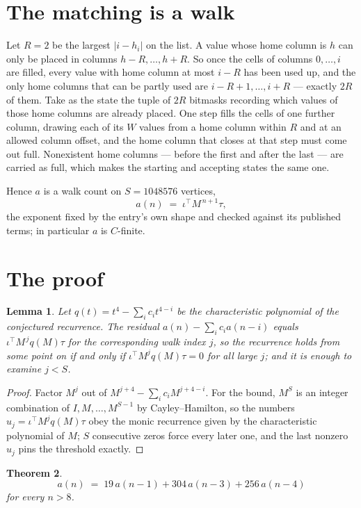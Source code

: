 \documentclass[11pt,a4paper]{article}
\theoremstyle{plain}
\newtheorem{theorem}{Theorem}
\newtheorem{lemma}[theorem]{Lemma}
\theoremstyle{definition}
\begin{document}
\section{The matching is a walk}

Let $R=2$ be the largest $|i-h_i|$ on the list. A value whose home column is $h$ can only be
placed in columns $h-R,\dots,h+R$. So once the cells of columns $0,\dots,i$ are filled, every
value with home column at most $i-R$ has been used up, and the only home columns that can be
partly used are $i-R+1,\dots,i+R$ --- exactly $2R$ of them. Take as the state the tuple of
$2R$ bitmasks recording which values of those home columns are already placed. One step fills
the cells of one further column, drawing each of its $W$ values from a home column within $R$
and at an allowed column offset, and the home column that closes at that step must come out
full. Nonexistent home columns --- before the first and after the last --- are carried as
full, which makes the starting and accepting states the same one.

Hence $a$ is a walk count on $S=1048576$ vertices,
\[
a(n)\;=\;\iota^{\!\top}M^{\,n+1}\tau ,
\]
the exponent fixed by the entry's own shape and checked against its published terms; in
particular $a$ is $C$-finite.

\section{The proof}

\begin{lemma}\label{lem:crit}
Let $q(t)=t^{4}-\sum_i c_it^{4-i}$ be the characteristic polynomial of the
conjectured recurrence. The residual $a(n)-\sum_ic_ia(n-i)$ equals
$\iota^{\!\top}M^{\,j}q(M)\tau$ for the corresponding walk index $j$, so the recurrence
holds from some point on if and only if $\iota^{\!\top}M^{j}q(M)\tau=0$ for all large $j$;
and it is enough to examine $j<S$.
\end{lemma}

\begin{proof}
Factor $M^{j}$ out of $M^{j+4}-\sum_ic_iM^{j+4-i}$. For the bound, $M^{S}$
is an integer combination of $I,M,\dots,M^{S-1}$ by Cayley--Hamilton, so the numbers
$u_j=\iota^{\!\top}M^{j}q(M)\tau$ obey the monic recurrence given by the characteristic
polynomial of $M$; $S$ consecutive zeros force every later one, and the last nonzero $u_j$
pins the threshold exactly.
\end{proof}

\begin{theorem}
\[
a(n)\;=\;19\,a(n-1) + 304\,a(n-3) + 256\,a(n-4)
\]
for every $n>8$.
\end{theorem}
\end{document}
